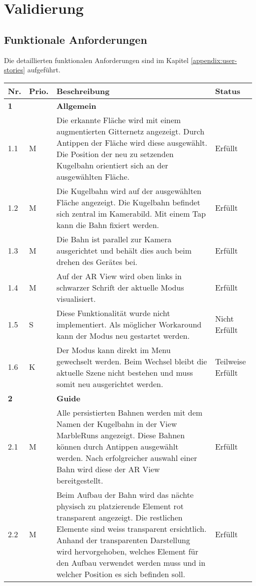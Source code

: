 \section{Validierung}


\subsection{Funktionale Anforderungen}

Die detaillierten funktionalen Anforderungen sind im Kapitel \ref{appendix:user-stories} aufgeführt.

\begin{longtable}{l l p{10cm} l}
	\hline
	\textbf{Nr.} & \textbf{Prio.} & \textbf{Beschreibung} & \textbf{Status} \\
	\hline
	\textbf{1} & & \textbf{Allgemein} & \\
	\hline
	1.1 & M & Die erkannte Fläche wird mit einem augmentierten Gitternetz angezeigt. Durch Antippen der Fläche wird diese ausgewählt. Die Position der neu zu setzenden Kugelbahn orientiert sich an der ausgewählten Fläche. & Erfüllt \\
	\hline
	1.2 & M & Die Kugelbahn wird auf der ausgewählten Fläche angezeigt. Die Kugelbahn befindet sich zentral im Kamerabild. Mit einem Tap kann die Bahn fixiert werden. & Erfüllt \\
	\hline
	1.3 & M & Die Bahn ist parallel zur Kamera ausgerichtet und behält dies auch beim drehen des Gerätes bei. & Erfüllt \\
	\hline
	1.4 & M & Auf der AR View wird oben links in schwarzer Schrift der aktuelle Modus visualisiert. & Erfüllt \\
	\hline
	1.5 & S & Diese Funktionalität wurde nicht implementiert. Als möglicher Workaround kann der Modus neu gestartet werden. & Nicht Erfüllt \\
	\hline
	1.6 & K & Der Modus kann direkt im Menu gewechselt werden. Beim Wechsel bleibt die aktuelle Szene nicht bestehen und muss somit neu ausgerichtet werden. & Teilweise Erfüllt \\
	\hline
	\textbf{2} & & \textbf{Guide} & \\
	\hline
	2.1 & M & Alle persistierten Bahnen werden mit dem Namen der Kugelbahn in der View MarbleRuns angezeigt. Diese Bahnen können durch Antippen ausgewählt werden. Nach erfolgreicher auswahl einer Bahn wird diese der AR View bereitgestellt. & Erfüllt \\
	\hline
	2.2 & M & Beim Aufbau der Bahn wird das nächte physisch zu platzierende Element rot transparent angezeigt. Die restlichen Elemente sind weiss transparent ersichtlich. Anhand der transparenten Darstellung wird hervorgehoben, welches Element für den Aufbau verwendet werden muss und in welcher Position es sich befinden soll.  & Erfüllt \\

\end{longtable}
